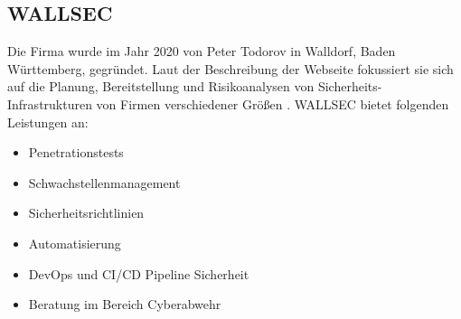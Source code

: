 \subsection{WALLSEC}
Die Firma wurde im Jahr 2020 von Peter Todorov in Walldorf, Baden Württemberg, gegründet. Laut der Beschreibung der Webseite fokussiert sie sich auf die Planung, Bereitstellung und Risikoanalysen von Sicherheits-Infrastrukturen von Firmen verschiedener Größen \citep{Wallsec}. WALLSEC bietet folgenden Leistungen an:

\begin{itemize}
   \item Penetrationstests
   \item Schwachstellenmanagement
   \item Sicherheitsrichtlinien
   \item Automatisierung
   \item DevOps und CI/CD Pipeline Sicherheit
   \item Beratung im Bereich Cyberabwehr
\end{itemize}








